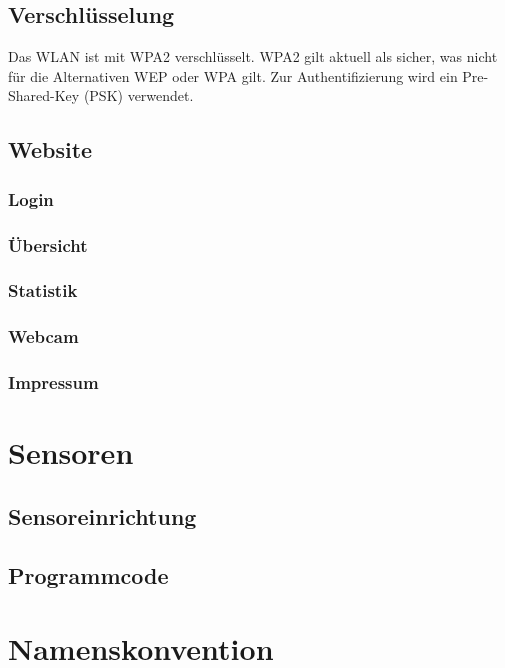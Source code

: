 \subsection{Verschlüsselung}

Das WLAN ist mit WPA2 verschlüsselt. WPA2 gilt aktuell als sicher, was nicht für
die Alternativen WEP oder WPA gilt. Zur Authentifizierung wird ein
Pre-Shared-Key (PSK) verwendet.

\subsection{Website}

\subsubsection{Login}

\subsubsection{Übersicht}

\subsubsection{Statistik}

\subsubsection{Webcam}

\subsubsection{Impressum}


\section{Sensoren}

\subsection{Sensoreinrichtung}

\subsection{Programmcode}

\section{Namenskonvention}
